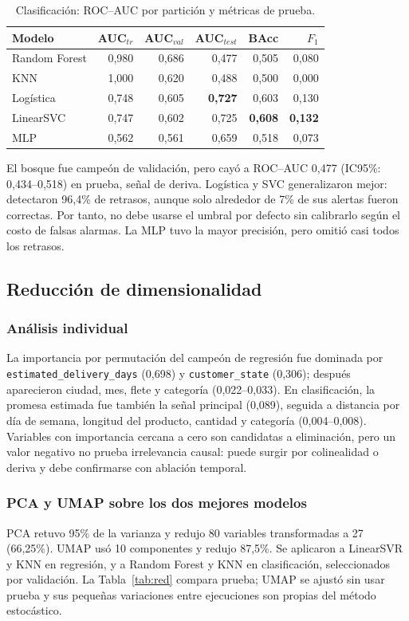 \documentclass[journal]{IEEEtran}
\begin{document}
\begin{table}[t]
\caption{Clasificación: ROC--AUC por partición y métricas de prueba.}
\label{tab:cls}
\centering\scriptsize
\begin{tabular}{lrrrrr}
\toprule
Modelo & AUC$_{tr}$ & AUC$_{val}$ & AUC$_{test}$ & BAcc & $F_1$ \\
\midrule
Random Forest & 0,980 & 0,686 & 0,477 & 0,505 & 0,080 \\
KNN & 1,000 & 0,620 & 0,488 & 0,500 & 0,000 \\
Logística & 0,748 & 0,605 & \textbf{0,727} & 0,603 & 0,130 \\
LinearSVC & 0,747 & 0,602 & 0,725 & \textbf{0,608} & \textbf{0,132} \\
MLP & 0,562 & 0,561 & 0,659 & 0,518 & 0,073 \\
\bottomrule
\end{tabular}
\end{table}

El bosque fue campeón de validación, pero cayó a ROC--AUC 0,477 (IC95\%: 0,434--0,518) en prueba, señal de deriva. Logística y SVC generalizaron mejor: detectaron 96,4\% de retrasos, aunque solo alrededor de 7\% de sus alertas fueron correctas. Por tanto, no debe usarse el umbral por defecto sin calibrarlo según el costo de falsas alarmas. La MLP tuvo la mayor precisión, pero omitió casi todos los retrasos.

\subsection{Reducción de dimensionalidad}
\subsubsection{Análisis individual}
La importancia por permutación del campeón de regresión fue dominada por \texttt{estimated\_delivery\_days} (0,698) y \texttt{customer\_state} (0,306); después aparecieron ciudad, mes, flete y categoría (0,022--0,033). En clasificación, la promesa estimada fue también la señal principal (0,089), seguida a distancia por día de semana, longitud del producto, cantidad y categoría (0,004--0,008). Variables con importancia cercana a cero son candidatas a eliminación, pero un valor negativo no prueba irrelevancia causal: puede surgir por colinealidad o deriva y debe confirmarse con ablación temporal.

\subsubsection{PCA y UMAP sobre los dos mejores modelos}
PCA retuvo 95\% de la varianza y redujo 80 variables transformadas a 27 (66,25\%). UMAP usó 10 componentes y redujo 87,5\%. Se aplicaron a LinearSVR y KNN en regresión, y a Random Forest y KNN en clasificación, seleccionados por validación. La Tabla~\ref{tab:red} compara prueba; UMAP se ajustó sin usar prueba y sus pequeñas variaciones entre ejecuciones son propias del método estocástico.
\end{document}

